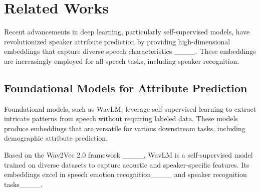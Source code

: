 \section{Related Works}
\label{related_work}


Recent advancements in deep learning, particularly self-supervised models, have revolutionized speaker attribute prediction by providing high-dimensional embeddings that capture diverse speech characteristics ____. These embeddings are increasingly employed for all speech tasks, including speaker recognition.

\subsection{Foundational Models for Attribute Prediction}
Foundational models, such as WavLM, leverage self-supervised learning to extract intricate patterns from speech without requiring labeled data. These models produce embeddings that are versatile for various downstream tasks, including demographic attribute prediction.

Based on the Wav2Vec 2.0 framework ____, WavLM is a self-supervised model trained on diverse datasets to capture acoustic and speaker-specific features. Its embeddings excel in speech emotion recognition____ and speaker recognition tasks____.



